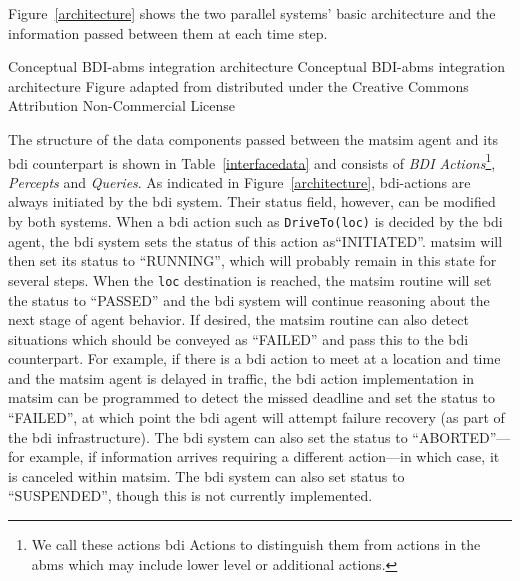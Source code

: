 Figure~\ref{architecture} shows the two parallel systems' basic architecture 
and the information passed between them
at each time step.

%

\createfigure%
{Conceptual BDI-\gls{abms} integration architecture}%
{Conceptual BDI-\gls{abms} integration architecture}%
{\label{architecture}}%
{\resizebox{0.75\textwidth}{!}{}}%
{Figure adapted from \citet[][Figure~1]{ecai} distributed under the Creative Commons Attribution Non-Commercial License}

The structure of the data components passed between the \gls{matsim} agent
and its \gls{bdi} counterpart is shown in Table~\ref{interfacedata} and
consists of {\it BDI Actions}\footnote{We call these actions \gls{bdi}
  Actions to distinguish them from actions in the \gls{abms} which may
  include lower level or additional actions.}, {\it Percepts} and {\it
  Queries}. As indicated in Figure~\ref{architecture}, \gls{bdi}-actions are
always initiated by the \gls{bdi} system. Their status field, however, can be
modified by both systems.  When a \gls{bdi} action such as
\lstinline{DriveTo(loc)} is decided by the \gls{bdi} agent, the \gls{bdi} system
sets the status of this action as``INITIATED''. \gls{matsim} will then
set its status to ``RUNNING'', which will probably remain in this state for
several steps. When the \lstinline{loc} destination is reached,
the \gls{matsim} routine will set the status to ``PASSED'' and the \gls{bdi}
system will continue reasoning about the next stage of agent
behavior. If desired, the \gls{matsim} routine can also detect situations
which should be conveyed as ``FAILED'' and pass this to the \gls{bdi}
counterpart. For example, if there is a \gls{bdi} action to meet at a
location and time and the \gls{matsim} agent is delayed in traffic, the \gls{bdi}
action implementation in \gls{matsim} can be programmed to detect the
missed deadline and set the status to ``FAILED'', at which
point the \gls{bdi} agent will attempt failure recovery (as part of the \gls{bdi}
infrastructure). The \gls{bdi} system can also set the status to 
``ABORTED''---for example, if information arrives requiring a different
action---in which case, it is canceled within \gls{matsim}. The \gls{bdi} system
can also set status to ``SUSPENDED'', though this is not currently
implemented.

